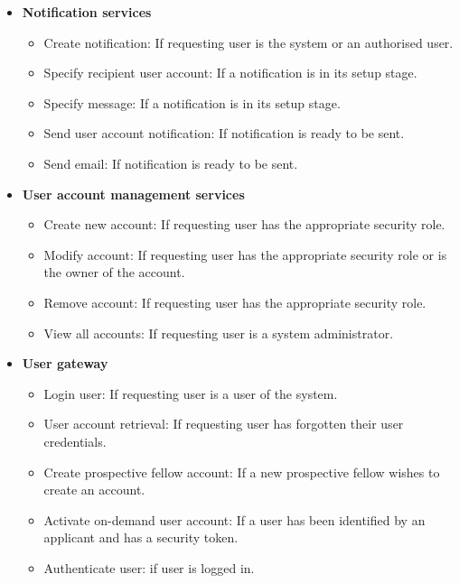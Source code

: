 \documentclass[12pt]{article}
\begin{document}
\begin{itemize}
	\item \textbf{Notification services}
		\begin{itemize}
			\item Create notification: If requesting user is the system or an authorised user.
			\item Specify recipient user account: If a notification is in its setup stage.				
			\item Specify message: If a notification is in its setup stage.
			\item Send user account notification: If notification is ready to be sent.
			\item Send email: If notification is ready to be sent.	
		\end{itemize}
	
	\item \textbf{User account management services}
		\begin{itemize}
			\item Create new account: If requesting user has the appropriate security role.
			\item Modify account: If requesting user has the appropriate security role or is the owner of the account.				
			\item Remove account: If requesting user has the appropriate security role.	
			\item View all accounts: If requesting user is a system administrator.					
		\end{itemize}
	
	\item \textbf{User gateway}
		\begin{itemize}
			\item Login user: If requesting user is a user of the system.
			\item User account retrieval: If requesting user has forgotten their user credentials.				
			\item Create prospective fellow account: If a new prospective fellow wishes to create an account.	
			\item Activate on-demand user account: If a user has been identified by an applicant and has a security token.
			\item Authenticate user: if user is logged in.						
		\end{itemize}
	

\end{itemize}
\end{document}
